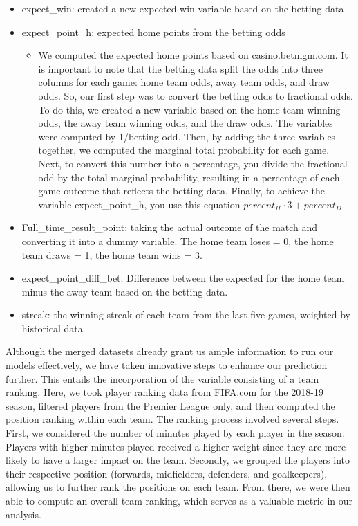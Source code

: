 \documentclass[
]{article}
\providecommand{\tightlist}{%
  \setlength{\itemsep}{0pt}\setlength{\parskip}{0pt}}
\begin{document}
\begin{itemize}
\tightlist
\item
  expect\_win: created a new expected win variable based on the betting
  data
\item
  expect\_point\_h: expected home points from the betting odds

  \begin{itemize}
  \tightlist
  \item
    We computed the expected home points based on
    \url{casino.betmgm.com}. It is important to note that the betting
    data split the odds into three columns for each game: home team
    odds, away team odds, and draw odds. So, our first step was to
    convert the betting odds to fractional odds. To do this, we created
    a new variable based on the home team winning odds, the away team
    winning odds, and the draw odds. The variables were computed by
    1/betting odd. Then, by adding the three variables together, we
    computed the marginal total probability for each game. Next, to
    convert this number into a percentage, you divide the fractional odd
    by the total marginal probability, resulting in a percentage of each
    game outcome that reflects the betting data. Finally, to achieve the
    variable expect\_point\_h, you use this equation
    \(percent_H \cdot 3 + percent_D\).
  \end{itemize}
\item
  Full\_time\_result\_point: taking the actual outcome of the match and
  converting it into a dummy variable. The home team loses = 0, the home
  team draws = 1, the home team wins = 3.
\item
  expect\_point\_diff\_bet: Difference between the expected for the home
  team minus the away team based on the betting data.
\item
  streak: the winning streak of each team from the last five games,
  weighted by historical data.
\end{itemize}

Although the merged datasets already grant us ample information to run
our models effectively, we have taken innovative steps to enhance our
prediction further. This entails the incorporation of the variable
consisting of a team ranking. Here, we took player ranking data from
FIFA.com for the 2018-19 season, filtered players from the Premier
League only, and then computed the position ranking within each team.
The ranking process involved several steps. First, we considered the
number of minutes played by each player in the season. Players with
higher minutes played received a higher weight since they are more
likely to have a larger impact on the team. Secondly, we grouped the
players into their respective position (forwards, midfielders,
defenders, and goalkeepers), allowing us to further rank the positions
on each team. From there, we were then able to compute an overall team
ranking, which serves as a valuable metric in our analysis.
\end{document}
